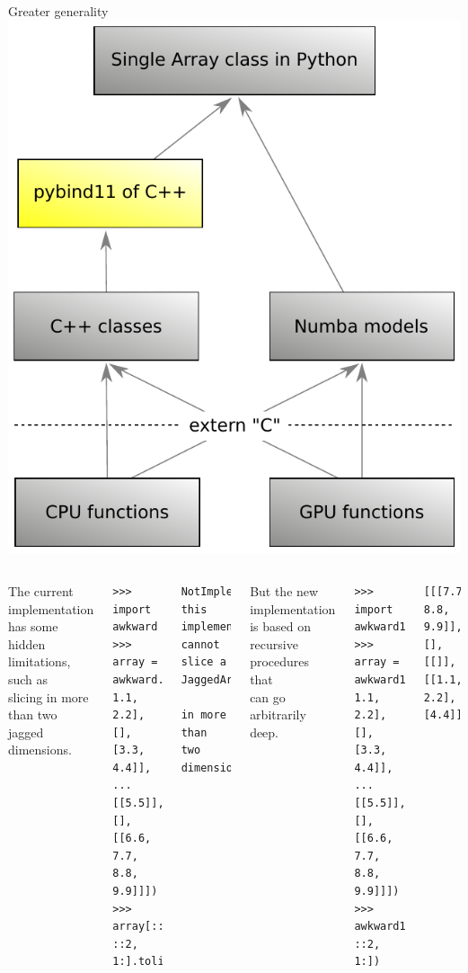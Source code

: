 \documentclass[aspectratio=169]{beamer}
\begin{document}
\begin{frame}[fragile]{Greater generality}
\large
\vspace{0.5 cm}
\hfill\mbox{\includegraphics[height=4 cm]{awkward-1-0-layers-mini-pybind11.pdf}\hspace{-0.75 cm}}

\vspace{-4 cm}
\begin{columns}
The current implementation has some hidden limitations, such as \\ slicing in more than two jagged dimensions.

\scriptsize
\begin{verbatim}
>>> import awkward
>>> array = awkward.fromiter([[[0.0, 1.1, 2.2], [], [3.3, 4.4]],
...                           [[5.5]], [], [[6.6, 7.7, 8.8, 9.9]]])
>>> array[::-1, ::2, 1:].tolist()
\end{verbatim}
\begin{Verbatim}[commandchars=\\\{\}]
NotImplementedError: this implementation cannot slice a JaggedArray
                     in more than two dimensions
\end{Verbatim}

\large
\vspace{0.5 cm}
But the new implementation is based on recursive procedures that \\ can go arbitrarily deep.

\scriptsize
\begin{verbatim}
>>> import awkward1
>>> array = awkward1.fromiter([[[0.0, 1.1, 2.2], [], [3.3, 4.4]],
...                            [[5.5]], [], [[6.6, 7.7, 8.8, 9.9]]])
>>> awkward1.tolist(array[::-1, ::2, 1:])
\end{verbatim}
\begin{Verbatim}[commandchars=\\\{\}]
[[[7.7, 8.8, 9.9]], [], [[]], [[1.1, 2.2], [4.4]]]
\end{Verbatim}
\end{columns}
\end{frame}
\end{document}
